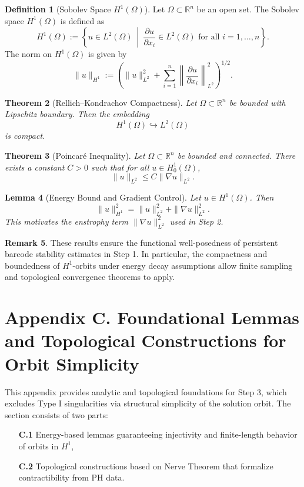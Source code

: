 \documentclass[11pt]{article}
\newtheorem{theorem}{Theorem}[section]
\newtheorem{lemma}[theorem]{Lemma}
\theoremstyle{definition}
\newtheorem{definition}[theorem]{Definition}
\newtheorem{remark}[theorem]{Remark}
\begin{document}
\begin{definition}[Sobolev Space \( H^1(\Omega) \)]
Let \( \Omega \subset \mathbb{R}^n \) be an open set. The Sobolev space \( H^1(\Omega) \) is defined as
\[
H^1(\Omega) := \left\{ u \in L^2(\Omega) \ \middle| \ \frac{\partial u}{\partial x_i} \in L^2(\Omega) \text{ for all } i = 1,\dots,n \right\}.
\]
The norm on \( H^1(\Omega) \) is given by
\[
\|u\|_{H^1} := \left( \|u\|_{L^2}^2 + \sum_{i=1}^n \left\| \frac{\partial u}{\partial x_i} \right\|_{L^2}^2 \right)^{1/2}.
\]
\end{definition}

\begin{theorem}[Rellich–Kondrachov Compactness]
Let \( \Omega \subset \mathbb{R}^n \) be bounded with Lipschitz boundary. Then the embedding
\[
H^1(\Omega) \hookrightarrow L^2(\Omega)
\]
is compact.
\end{theorem}

\begin{theorem}[Poincaré Inequality]
Let \( \Omega \subset \mathbb{R}^n \) be bounded and connected. There exists a constant \( C > 0 \) such that for all \( u \in H^1_0(\Omega) \),
\[
\|u\|_{L^2} \leq C \|\nabla u\|_{L^2}.
\]
\end{theorem}

\begin{lemma}[Energy Bound and Gradient Control]
Let \( u \in H^1(\Omega) \). Then
\[
\|u\|_{H^1}^2 = \|u\|_{L^2}^2 + \|\nabla u\|_{L^2}^2.
\]
This motivates the enstrophy term \( \|\nabla u\|_{L^2}^2 \) used in Step 2.
\end{lemma}

\begin{remark}
These results ensure the functional well-posedness of persistent barcode stability estimates in Step 1. In particular, the compactness and boundedness of \( H^1 \)-orbits under energy decay assumptions allow finite sampling and topological convergence theorems to apply.
\end{remark}


\section*{Appendix C. Foundational Lemmas and Topological Constructions for Orbit Simplicity}
\label{sec:appendixC}

This appendix provides analytic and topological foundations for Step 3, which excludes Type I singularities via structural simplicity of the solution orbit. The section consists of two parts:
\begin{itemize}
  \item[\textbf{C.1}] Energy-based lemmas guaranteeing injectivity and finite-length behavior of orbits in \( H^1 \),
  \item[\textbf{C.2}] Topological constructions based on Nerve Theorem that formalize contractibility from PH data.
\end{itemize}
\end{document}
